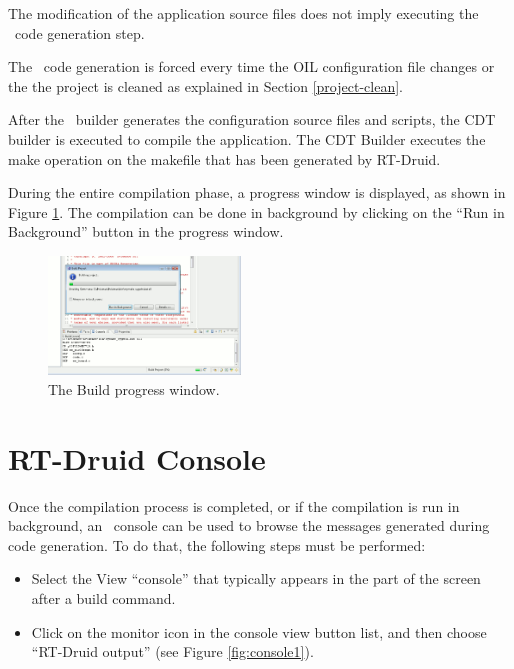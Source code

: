The modification of the application source files does not imply
executing the \rtd\ code generation step.

The \rtd\ code generation is forced every time the OIL configuration 
file changes or the the project is cleaned as explained in Section 
\ref{project-clean}. 

After the \rtd\ builder generates the configuration source files and
scripts, the CDT builder is executed to compile the application. The
CDT Builder executes the make operation on the makefile that has been
generated by RT-Druid.

During the entire compilation phase, a progress window is displayed,
as shown in Figure \ref{fig:buildproc2}. The compilation can be done
in background by clicking on the ``Run in Background'' button in the
progress window.

\begin{figure}
  \begin{center}
    \includegraphics[width=5.1cm, bb=0 0 893 553]{images/buildproc2.png}
  \end{center}
  \caption{The Build progress window.}
  \label{fig:buildproc2}
\end{figure}

\section{RT-Druid Console}

Once the compilation process is completed, or if the compilation is
run in background, an \rtd\ console can be used to browse the messages
generated during code generation. To do that, the following steps must
be performed:

\begin{itemize}
\item Select the View ``console'' that typically appears in the 
  part of the screen after a build command.
\item Click on the monitor icon in the console view button list, and
  then choose ``RT-Druid output'' (see Figure \ref{fig:console1}).
\end{itemize}

